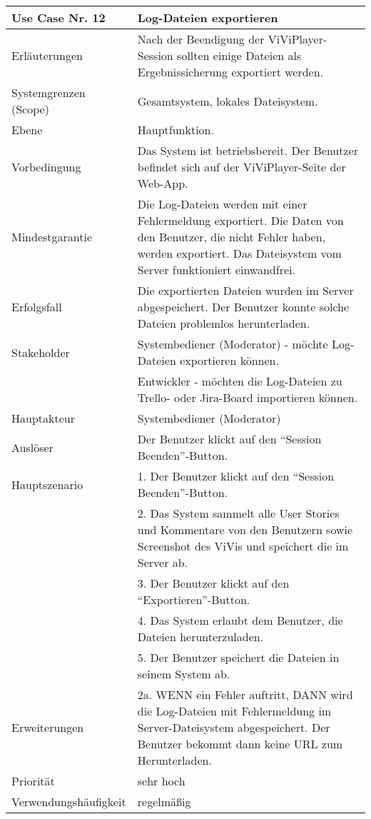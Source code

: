 \begin{tabularx}{\linewidth}{|l|X|}
	\hline
	Use Case Nr. 12			& \textbf{Log-Dateien exportieren} \\ \hline
	Erläuterungen			& Nach der Beendigung der ViViPlayer-Session sollten einige Dateien
							  als Ergebnissicherung exportiert werden. \\ \hline
	Systemgrenzen (Scope)	& Gesamtsystem, lokales Dateisystem. \\ \hline
	Ebene					& Hauptfunktion. \\ \hline
	Vorbedingung			& Das System ist betriebsbereit. Der Benutzer befindet sich auf der 
							  ViViPlayer-Seite der Web-App. \\ \hline
	Mindestgarantie			& Die Log-Dateien werden mit einer Fehlermeldung exportiert. Die 
							  Daten von den Benutzer, die nicht Fehler haben, werden exportiert. Das Dateisystem vom Server funktioniert einwandfrei.\\ \hline
	Erfolgsfall				& Die exportierten Dateien wurden im Server abgespeichert. Der 
							  Benutzer konnte solche Dateien problemlos herunterladen. \\ \hline
	Stakeholder				& Systembediener (Moderator) - möchte Log-Dateien exportieren 
							  können.\\ 
							& Entwickler - möchten die Log-Dateien zu Trello- oder Jira-Board 
							  importieren können. \\ \hline
	Hauptakteur				& Systembediener (Moderator) \\ \hline
	Auslöser				& Der Benutzer klickt auf den ``Session Beenden''-Button. \\ \hline	
	Hauptszenario			& 1. Der Benutzer klickt auf den ``Session Beenden''-Button. \\
							& 2. Das System sammelt alle User Stories und Kommentare von den 
							  Benutzern sowie Screenshot des ViVis und speichert die im Server 
							  ab. \\
							& 3. Der Benutzer klickt auf den ``Exportieren''-Button. \\
							& 4. Das System erlaubt dem Benutzer, die Dateien herunterzuladen. \\
							& 5. Der Benutzer speichert die Dateien in seinem System ab. 
							  \\ \hline
	Erweiterungen			& 2a. WENN ein Fehler auftritt, DANN wird die Log-Dateien mit 
							  Fehlermeldung im Server-Dateisystem abgespeichert. Der Benutzer bekommt dann keine URL zum Herunterladen. \\ \hline
	Priorität				& sehr hoch \\ \hline
	Verwendungshäufigkeit	& regelmäßig \\ \hline
\end{tabularx}

